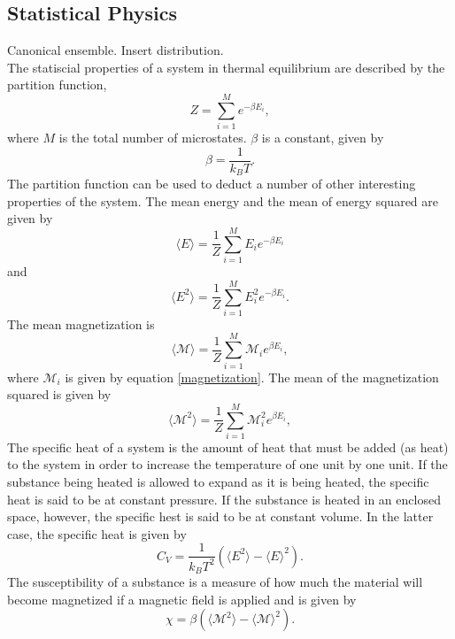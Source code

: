 \documentclass[notitlepage, reprint, nofootinbib]{revtex4-1}
\begin{document}
\subsection{Statistical Physics}
Canonical ensemble. Insert distribution.\\[2mm]
The statiscial properties of a system in thermal equilibrium are described by the partition function, 
\begin{equation}\label{partition_function}Z=\sum_{i=1}^M e^{-\beta E_i},\end{equation}
where $M$ is the total number of microstates. $\beta$ is a constant, given by 
\begin{equation}\label{beta}\beta=\frac{1}{k_BT}.\end{equation}
The partition function can be used to deduct a number of other interesting properties of the system. The mean energy and the mean of energy squared are given by 
\begin{equation}\label{mean_energy}\langle E\rangle =\frac{1}{Z}\sum_{i=1}^ME_ie^{-\beta E_i}\end{equation}
and
\begin{equation}\label{mean_energy_2}\langle E^2\rangle = \frac{1}{Z}\sum_{i=1}^M E_i^2 e^{-\beta E_i}.\end{equation}
The mean magnetization is 
\begin{equation}\label{mean_mag}\langle \mathcal{M}\rangle =\frac{1}{Z}\sum_{i=1}^M\mathcal{M}_i e^{\beta E_i},\end{equation}
where $\mathcal{M}_i$ is given by equation \ref{magnetization}. The mean of the magnetization squared is given by 
\begin{equation}\label{mean_mag2}\langle \mathcal{M}^2\rangle =\frac{1}{Z}\sum_{i=1}^M\mathcal{M}_i^2 e^{\beta E_i},\end{equation}
The specific heat of a system is the amount of heat that must be added (as heat) to the system in order to increase the temperature of one unit by one unit. If the substance being heated is allowed to expand as it is being heated, the specific heat is said to be at constant pressure. If the substance is heated in an enclosed space, however, the specific hest is said to be at constant volume. In the latter case, the specific heat is given by 
\begin{equation}\label{specific_heat}C_V = \frac{1}{k_BT^2}(\langle E^2\rangle - \langle E\rangle^2).\end{equation}
The susceptibility of a substance is a measure of how much the material will become magnetized if a magnetic field is applied and is given by 
\begin{equation}\label{susceptibility}\chi = \beta (\langle \mathcal{M}^2\rangle -\langle \mathcal{M}\rangle^2).\end{equation}
\end{document}
